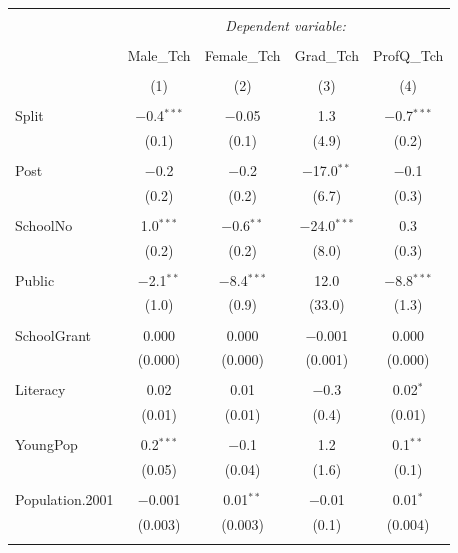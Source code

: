 \documentclass[12pt, a4paper]{article}
\begin{document}
\begin{table}[!htbp] \centering 
  \caption{} 
  \label{} 
\begin{tabular}{@{\extracolsep{5pt}}lcccc} 
\\[-1.8ex]\hline 
\hline \\[-1.8ex] 
 & \multicolumn{4}{c}{\textit{Dependent variable:}} \\ 
\cline{2-5} 
\\[-1.8ex] & Male\_Tch & Female\_Tch & Grad\_Tch & ProfQ\_Tch \\ 
\\[-1.8ex] & (1) & (2) & (3) & (4)\\ 
\hline \\[-1.8ex] 
 Split & $-$0.4$^{***}$ & $-$0.05 & 1.3 & $-$0.7$^{***}$ \\ 
  & (0.1) & (0.1) & (4.9) & (0.2) \\ 
  & & & & \\ 
 Post & $-$0.2 & $-$0.2 & $-$17.0$^{**}$ & $-$0.1 \\ 
  & (0.2) & (0.2) & (6.7) & (0.3) \\ 
  & & & & \\ 
 SchoolNo & 1.0$^{***}$ & $-$0.6$^{**}$ & $-$24.0$^{***}$ & 0.3 \\ 
  & (0.2) & (0.2) & (8.0) & (0.3) \\ 
  & & & & \\ 
 Public & $-$2.1$^{**}$ & $-$8.4$^{***}$ & 12.0 & $-$8.8$^{***}$ \\ 
  & (1.0) & (0.9) & (33.0) & (1.3) \\ 
  & & & & \\ 
 SchoolGrant & 0.000 & 0.000 & $-$0.001 & 0.000 \\ 
  & (0.000) & (0.000) & (0.001) & (0.000) \\ 
  & & & & \\ 
 Literacy & 0.02 & 0.01 & $-$0.3 & 0.02$^{*}$ \\ 
  & (0.01) & (0.01) & (0.4) & (0.01) \\ 
  & & & & \\ 
 YoungPop & 0.2$^{***}$ & $-$0.1 & 1.2 & 0.1$^{**}$ \\ 
  & (0.05) & (0.04) & (1.6) & (0.1) \\ 
  & & & & \\ 
 Population.2001 & $-$0.001 & 0.01$^{**}$ & $-$0.01 & 0.01$^{*}$ \\ 
  & (0.003) & (0.003) & (0.1) & (0.004) \\ 
  & & & & \\ 

\end{tabular}
\end{table}
\end{document}
